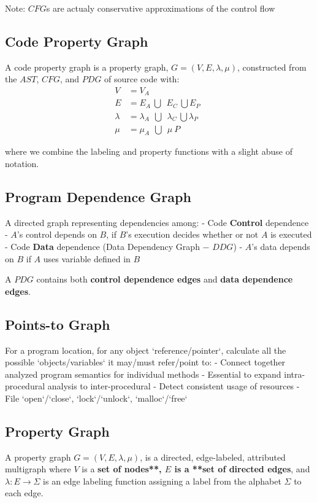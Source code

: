 Note: $CFG$s are actualy conservative approximations of the control flow

\subsection{Code Property Graph}

A code property graph is a property graph, $G = (V,E,λ,μ)$, constructed from the $AST$, $CFG$, and $PDG$ of source code with:
\begin{align}
{V} &= V_{A} \\
{E} &= E_{A}\ {\bigcup}\ \ E_{C}\ \bigcup E_{P}\ \ \\ 
{λ} &= λ_{A}\ \ {\bigcup}\ \ λ_{C}\ \bigcup λ_{P}\ \ \\
{μ} &= μ_{A}\ \ {\bigcup}\ \ μ\ P 
\end{align}

where we combine the labeling and property functions with a slight abuse of notation.

\subsection{Program Dependence Graph}
 A directed graph representing dependencies among:
 - Code \textbf{Control} dependence
 - $A$'s control depends on $B$, if $B$’s execution decides whether or not $A$ is executed
 - Code \textbf{Data} dependence (Data Dependency Graph $-$ $DDG$)
 - $A$'s data depends on $B$ if $A$ uses variable defined in $B$

A $PDG$ contains both \textbf{control dependence edges} and \textbf{data dependence edges}.

\subsection{Points-to Graph}
 
For a program location, for any object `reference/pointer`, calculate all the possible `objects/variables` it may/must refer/point to:
  - Connect together analyzed program semantics for individual methods
  - Essential to expand intra-procedural analysis to inter-procedural
  - Detect consistent usage of resources
  - File `open`/`close`, `lock`/`unlock`, `malloc`/`free` 

\subsection{Property Graph}
A property graph $G=(V,E,λ,μ)$, is a directed, edge-labeled, attributed multigraph where $V$ is a \textbf{set of nodes**, $E$ is a **set of directed edges}, and $λ : E → Σ$ is an edge labeling function assigning a label from the alphabet $Σ$ to each edge.

